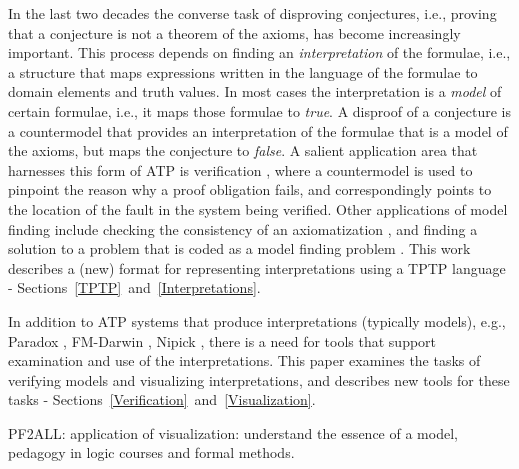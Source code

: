 \documentclass[letterpaper]{article}
\begin{document}
In the last two decades the converse task of disproving conjectures, i.e., proving that a 
conjecture is not a theorem of the axioms, has become increasingly important.
This process depends on finding an {\em interpretation} of the formulae, i.e., a structure that
maps expressions written in the language of the formulae to domain elements and truth values.
In most cases the interpretation is a {\em model} of certain formulae, i.e., it maps those
formulae to {\em true}.
A disproof of a conjecture is a countermodel that provides an interpretation of the formulae 
that is a model of the axioms, but maps the conjecture to {\em false}.
A salient application area that harnesses this form of ATP is verification \cite{DKW08},
where a countermodel is used to pinpoint the reason why a proof obligation fails, and
correspondingly points to the location of the fault in the system being verified.
Other applications of model finding include checking the consistency of an axiomatization 
\cite{SS+17}, and finding a solution to a problem that is coded as a model finding problem 
\cite{Win82}.
This work describes a (new) format for representing interpretations using a TPTP language -
Sections~\ref{TPTP}~and~\ref{Interpretations}.

In addition to ATP systems that produce interpretations (typically models),
e.g., Paradox \cite{CS03}, FM-Darwin \cite{BF+09}, Nipick \cite{BN10-ITP},
there is a need for tools that support examination and use of the interpretations.
This paper examines the tasks of verifying models and visualizing interpretations, and describes 
new tools for these tasks - Sections~\ref{Verification}~and~\ref{Visualization}.

PF2ALL: application of visualization: understand the essence of a model, pedagogy in logic courses and formal methods.
\end{document}
